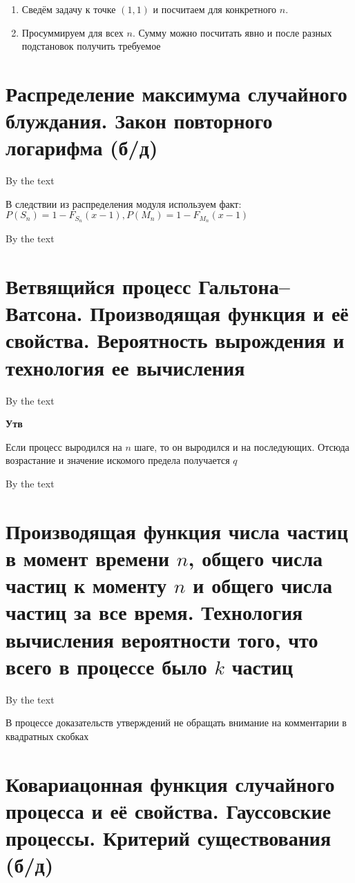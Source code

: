 \documentclass[a4paper, 14pt]{article}
\begin{document}
    \begin{enumerate}
        \item Сведём задачу к точке $(1,1)$ и посчитаем для конкретного $n$.
        \item Просуммируем для всех $n$.
        Сумму можно посчитать явно и после разных подстановок получить требуемое
    \end{enumerate}
    
    \section{Распределение максимума случайного блуждания. Закон повторного логарифма (б/д)}
    
    By the text
    
    В следствии из распределения модуля используем факт: $P(S_n) = 1 - F_{S_n}(x-1), P(M_n) = 1 - F_{M_n}(x-1)$
    
    By the text
    
    \section{Ветвящийся процесс Гальтона–Ватсона.
    Производящая функция и её свойства.
    Вероятность вырождения и технология ее вычисления}
    
    By the text

    \textbf{Утв}
    
    Если процесс выродился на $n$ шаге, то он выродился и на последующих.
    Отсюда возрастание и значение искомого предела получается $q$
    
    By the text
    
    \section{Производящая функция числа частиц в момент времени $n$, общего числа частиц к моменту $n$ и общего числа
    частиц за все время.
    Технология вычисления вероятности того, что всего в процессе было $k$ частиц}
    
    By the text
    
    В процессе доказательств утверждений не обращать внимание на комментарии в квадратных скобках
    
    \section{Ковариацонная функция случайного процесса и её свойства.
    Гауссовские процессы.
Критерий существования (б/д)}
    
\end{document}
